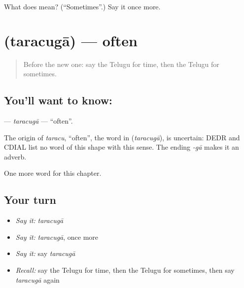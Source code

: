 \begin{tcolorbox}[breakable,colback=teal!4,colframe=teal!35!black,title={Before you move on}]
What does  mean? (\textquotedblleft{}Sometimes\textquotedblright{}.) Say it once more.
\end{tcolorbox}
\section[\texorpdfstring{\te{తరచుగా} (taracugā)}{తరచుగా (taracugā)}]{ (taracugā) — often}

\label{lesson:TE-C170-taracuga}



\begin{quote}
Before the new one: say the Telugu for time, then the Telugu for sometimes.
\end{quote}

\subsection*{You'll want to know: }
\textbf{} — \emph{taracugā} — \textquotedblleft{}often\textquotedblright{}.

\begin{cousinweb}
The origin of \emph{taracu}, \textquotedblleft{}often\textquotedblright{}, the word in \textbf{} (\emph{taracugā}), is uncertain: DEDR and CDIAL list no word of this shape with this sense. The ending \emph{-gā} makes it an adverb.
\end{cousinweb}

\begin{grammarlens}[title={What you've built}]
One more word for this chapter.
\end{grammarlens}

\subsection*{Your turn}
\begin{itemize}
\raggedright
  \item \emph{Say it:} \emph{taracugā}
  \item \emph{Say it:} \emph{taracugā}, once more
  \item \emph{Say it:} say \emph{taracugā}
  \item \emph{Recall:} say the Telugu for time, then the Telugu for sometimes, then say \emph{taracugā} again
\end{itemize}


